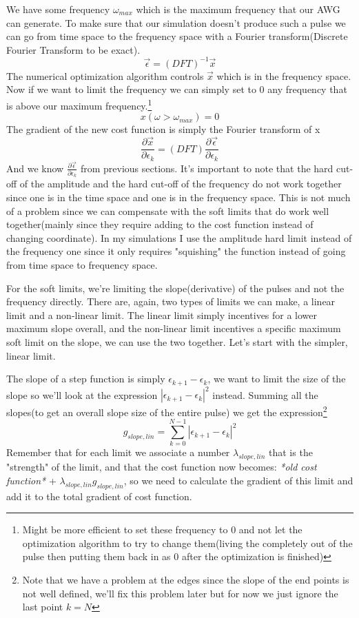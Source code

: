 \documentclass[english, a4paper, 12pt, twoside]{article}
\numberwithin{equation}{section} %
\begin{document}
We have some frequency \( \omega_{max} \) which is the maximum frequency that our AWG can generate. To make sure that our simulation doesn't produce such a pulse we can go from time space to the frequency space with a Fourier transform(Discrete Fourier Transform to be exact).
\[
    \vec{\epsilon} = (DFT)^{-1} \vec{x}
\]
The numerical optimization algorithm controls \(\vec{x}\) which is in the frequency space. Now if we want to limit the frequency we can simply set to 0 any frequency that is above our maximum frequency.\footnote{Might be more efficient to set these frequency to 0 and not let the optimization algorithm to try to change them(living the completely out of the pulse then putting them back in as 0 after the optimization is finished)}
\[
    x(\omega > \omega_{max}) = 0
\]
The gradient of the new cost function is simply the Fourier transform of x
\[
    \frac{\partial \vec{x}}{\partial \epsilon_k} = (DFT) \frac{\partial \vec{\epsilon}}{\partial \epsilon_k}
\]
And we know \(\frac{\partial \vec{\epsilon}}{\partial \epsilon_k}\) from previous sections.
It's important to note that the hard cut-off of the amplitude and the hard cut-off of the frequency do not work together since one is in the time space and one is in the frequency space. This is not much of a problem since we can compensate with the soft limits that do work well together(mainly since they require adding to the cost function instead of changing coordinate). In my simulations I use the amplitude hard limit instead of the frequency one since it only requires "squishing" the function instead of going from time space to frequency space.

For the soft limits, we're limiting the slope(derivative) of the pulses and not the frequency directly. There are, again, two types of limits we can make, a linear limit and a non-linear limit. The linear limit simply incentives for a lower maximum slope overall, and the non-linear limit incentives a specific maximum soft limit on the slope, we can use the two together. Let's start with the simpler, linear limit.

The slope of a step function is simply \(\epsilon_{k+1} - \epsilon_{k}\), we want to limit the size of the slope so we'll look at the expression \(|\epsilon_{k+1} - \epsilon_{k}|^2\) instead. Summing all the slopes(to get an overall slope size of the entire pulse) we get the expression\footnote{Note that we have a problem at the edges since the slope of the end points is not well defined, we'll fix this problem later but for now we just ignore the last point \(k=N\)}
\begin{equation}\label{eq:g_slope,lin}
    g_{slope, lin} = \sum_{k=0}^{N-1} |\epsilon_{k+1} - \epsilon_{k}|^2
\end{equation}{}
Remember that for each limit we associate a number \(\lambda_{slope, lin}\) that is the "strength" of the limit, and that the cost function now becomes: \textit{*old cost function*} + \(\lambda_{slope, lin} g_{slope, lin}\), so we need to calculate the gradient of this limit and add it to the total gradient of cost function.
\end{document}

